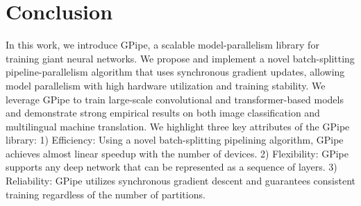 \documentclass{article}
\def\codename{GPipe}
\begin{document}
\section{Conclusion}
In this work, we introduce \codename{}, a scalable model-parallelism library for training giant neural networks. We propose and implement a novel batch-splitting pipeline-parallelism algorithm that uses synchronous gradient updates, allowing model parallelism with high hardware utilization and training stability. We leverage \codename{} to train large-scale convolutional and transformer-based models and demonstrate strong empirical results on both image classification and multilingual machine translation. We highlight three key attributes of the \codename{} library: 1) Efficiency: Using a novel batch-splitting pipelining algorithm, \codename{} achieves almost linear speedup with the number of devices. 2) Flexibility: \codename{} supports any deep network that can be represented as a sequence of layers. 3) Reliability: \codename{} utilizes synchronous gradient descent and guarantees consistent training regardless of the number of partitions. 

{\small
}

\end{document}
